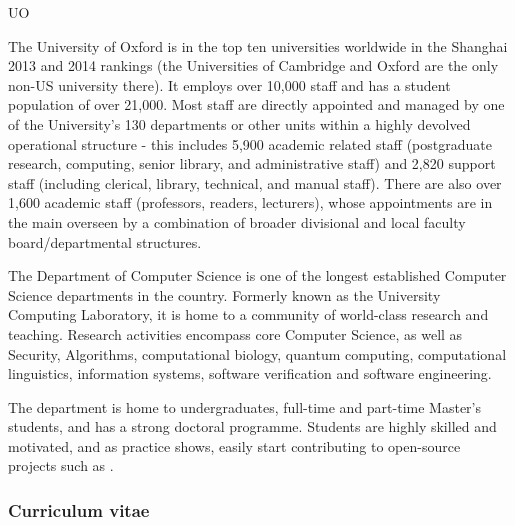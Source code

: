 \begin{sitedescription}{UO}



The University of Oxford is in the top ten universities worldwide in the Shanghai 2013 and 2014
rankings (the Universities of Cambridge and Oxford are the only non-US university there).
It employs over 10,000 staff and has a student population of over 21,000.
Most staff are directly appointed and managed by one of the University's 130 departments or
other units within a highly devolved operational structure - this includes 5,900 academic related
staff (postgraduate research, computing, senior library, and administrative staff) and
2,820 support staff (including clerical, library, technical, and manual staff). There are also
over 1,600 academic staff (professors, readers, lecturers), whose appointments are in the
main overseen by a combination of broader divisional and local faculty board/departmental
structures. 

The Department of Computer Science is one of the longest established
Computer Science departments in the country. Formerly known as the
University Computing Laboratory, it is home to a community of world-class research and
teaching. Research activities encompass core Computer Science, as well as Security,
Algorithms, computational biology, quantum computing, computational linguistics,
information systems, software verification and software engineering. 

The department is home to undergraduates, full-time and part-time Master's
students, and has a strong doctoral programme.  Students are highly skilled and
motivated, and as practice shows, easily start contributing to open-source
projects such as \Sage.

\subsubsection*{Curriculum vitae}






\end{sitedescription}

